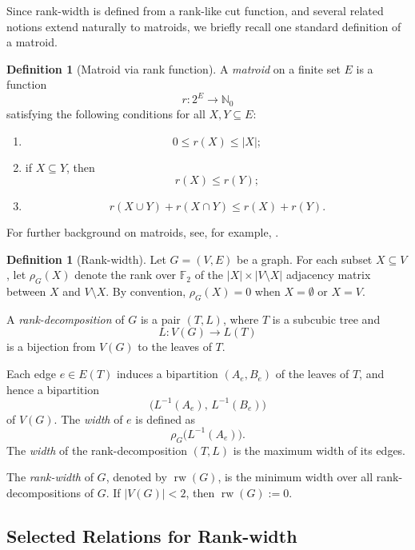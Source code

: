 \documentclass[10pt]{book}
\theoremstyle{definition}
\newtheorem{definition}[theorem]{Definition}
\begin{document}
Since rank-width is defined from a rank-like cut function, and several related notions extend naturally to matroids, we briefly recall one standard definition of a matroid.

\begin{definition}[Matroid via rank function]
\label{def:Matroid}
A \emph{matroid} on a finite set \(E\) is a function
\[
r:2^E\to \mathbb{N}_0
\]
satisfying the following conditions for all \(X,Y\subseteq E\):
\begin{enumerate}
    \item
    \[
    0\leq r(X)\leq |X|;
    \]
    \item if \(X\subseteq Y\), then
    \[
    r(X)\leq r(Y);
    \]
    \item
    \[
    r(X\cup Y)+r(X\cap Y)\leq r(X)+r(Y).
    \]
\end{enumerate}
\end{definition}

For further background on matroids, see, for example, \cite{oxley2006matroid,white1986theory}.

\begin{definition}[Rank-width]
\cite{37}
Let \(G=(V,E)\) be a graph.  
For each subset \(X\subseteq V\), let \(\rho_G(X)\) denote the rank over \(\mathbb{F}_2\) of the \(|X|\times |V\setminus X|\) adjacency matrix between \(X\) and \(V\setminus X\).  
By convention, \(\rho_G(X)=0\) when \(X=\emptyset\) or \(X=V\).

A \emph{rank-decomposition} of \(G\) is a pair \((T,L)\), where \(T\) is a subcubic tree and
\[
L:V(G)\to L(T)
\]
is a bijection from \(V(G)\) to the leaves of \(T\).

Each edge \(e\in E(T)\) induces a bipartition \((A_e,B_e)\) of the leaves of \(T\), and hence a bipartition
\[
\bigl(L^{-1}(A_e),\,L^{-1}(B_e)\bigr)
\]
of \(V(G)\).
The \emph{width} of \(e\) is defined as
\[
\rho_G\bigl(L^{-1}(A_e)\bigr).
\]
The \emph{width} of the rank-decomposition \((T,L)\) is the maximum width of its edges.

The \emph{rank-width} of \(G\), denoted by \(\operatorname{rw}(G)\), is the minimum width over all rank-decompositions of \(G\).  
If \(|V(G)|<2\), then \(\operatorname{rw}(G):=0\).
\end{definition}

\subsection{Selected Relations for Rank-width}
\end{document}
